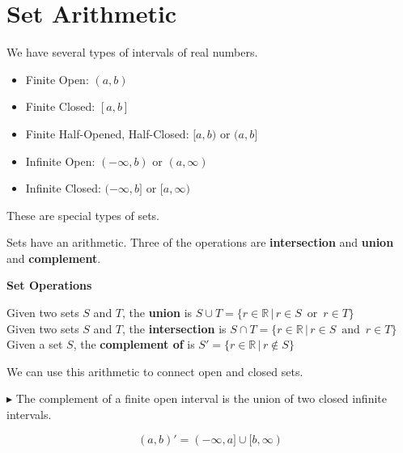 \documentclass{ximera}
\begin{document}
\section{Set Arithmetic}


We have several types of intervals of real numbers.


\begin{itemize}
\item Finite Open:   $(a, b)$
\item Finite Closed: $[a, b]$
\item Finite Half-Opened, Half-Closed:  $[a, b)$  or $(a,b]$ \\

\item Infinite Open: $(-\infty, b)$ or $(a, \infty)$
\item Infinite Closed: $(-\infty, b]$ or $[a, \infty)$

\end{itemize}

These are special types of sets.


Sets have an arithmetic. Three of the operations are \textbf{intersection} and \textbf{union} and \textbf{complement}.



\begin{definition} \textbf{\textcolor{green!50!black}{Set Operations}} 


Given two sets $S$ and $T$, the \textbf{union} is $S \cup T = \{ r \in \mathbb{R} \, | \, r \in S \, \text{ or } \, r \in T    \}$ \\

Given two sets $S$ and $T$, the \textbf{intersection} is $S \cap T = \{ r \in \mathbb{R} \, | \, r \in S \, \text{ and } \, r \in T    \}$ \\
 
Given a set $S$, the \textbf{complement of} is $S'  = \{ r \in \mathbb{R} \, | \, r \not\in S  \}$ 


\end{definition}







We can use this arithmetic to connect open and closed sets.

$\blacktriangleright$ The complement of a finite open interval is the union of two closed infinite intervals.

\[    (a,b)'  = (-\infty, a] \cup [b, \infty)          \]
\end{document}
